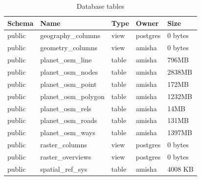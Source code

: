 \fi

\begin{table}[h!]
	\caption{Database tables}

	\begin{tabular}{|p{2cm}|p{4.5cm}|p{2.5cm}|p{2cm}|p{2cm}|}
		\hline
		Schema & Name & Type & Owner
		& Size \\

		\hline \rule[-2ex]{0pt}{5.5ex}
		public & geography\_columns & view
		& postgres & 0 bytes\\


                \hline \rule[-2ex]{0pt}{5.5ex}
                public & geometry\_columns & view
                & amisha & 0 bytes\\


                \hline \rule[-2ex]{0pt}{5.5ex}
                public & planet\_osm\_line & table
                & amisha & 796MB\\

               \hline \rule[-2ex]{0pt}{5.5ex}
                public & planet\_osm\_nodes & table
                & amisha & 2838MB\\

               \hline \rule[-2ex]{0pt}{5.5ex}
                public & planet\_osm\_point & table
                & amisha & 172MB\\

               \hline \rule[-2ex]{0pt}{5.5ex}
                public & planet\_osm\_polygon & table
                & amisha & 1232MB\\

               \hline \rule[-2ex]{0pt}{5.5ex}
                public & planet\_osm\_rels & table
                & amisha & 14MB\\

               \hline \rule[-2ex]{0pt}{5.5ex}
                public & planet\_osm\_roads & table
                & amisha & 131MB\\

               \hline \rule[-2ex]{0pt}{5.5ex}
                public & planet\_osm\_ways & table
                & amisha & 1397MB\\

                \hline \rule[-2ex]{0pt}{5.5ex}
                public & raster\_columns & view
                & postgres & 0 bytes\\

                \hline \rule[-2ex]{0pt}{5.5ex}
                public & raster\_overviews & view
                & postgres & 0 bytes\\

                \hline \rule[-2ex]{0pt}{5.5ex}
                public & spatial\_ref\_sys & table
                & amisha & 4008 KB\\


		\hline
	\end{tabular}
\end{table}

